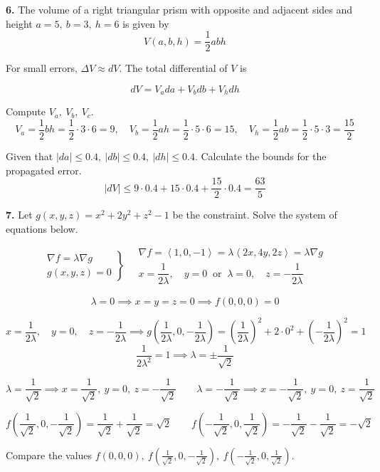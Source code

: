 \documentclass{article}
\begin{document}
\vspace{1em}

\textbf{6.} The volume of a right triangular prism with opposite and adjacent sides and height $a=5,\:b=3,\:h=6$ is given by
\[V(a,b,h)=\frac12 abh\]

For small errors, $\Delta V\approx dV$. The total differential of $V$ is

\[dV=V_ada+V_bdb+V_hdh\]

Compute $V_a,\: V_b,\: V_c$.
\[V_a=\frac12bh=\frac12\cdot3\cdot6=9,\quad V_b=\frac12ah=\frac12\cdot5\cdot6=15,\quad V_h=\frac12ab=\frac12\cdot5\cdot3=\frac{15}2\]

Given that $|da|\leq0.4,\:|db|\leq0.4,\:|dh|\leq0.4$. Calculate the bounds for the propagated error.
\[\left|dV\right|\leq9\cdot0.4+15\cdot0.4+\frac{15}2\cdot0.4=\boxed{\frac{63}5}\]

\vspace{1em}

\textbf{7.} Let $g(x,y,z)=x^2+2y^2+z^2-1$ be the constraint. Solve the system of equations below.

\[
\left.
\begin{array}{c}
\displaystyle\nabla f=\lambda\nabla g\\
\displaystyle g(x,y,z)=0
\end{array}
\right\}\quad
\begin{array}{l}
\nabla f=\left\langle1,0,-1\right\rangle=\lambda\left\langle2x,4y,2z\right\rangle=\lambda\nabla g\\[1em]x=\dfrac1{2\lambda},\quad y=0\:\text{ or }\:\lambda=0,\quad z=-\dfrac1{2\lambda}
\end{array}
\]

\[\lambda=0\implies x=y=z=0\implies f(0,0,0)=0\]

\[x=\frac1{2\lambda},\quad y=0,\quad z=-\frac1{2\lambda}\implies g\left(\frac1{2\lambda},0,-\frac1{2\lambda}\right)=\left(\frac1{2\lambda}\right)^2+2\cdot0^2+\left(-\frac1{2\lambda}\right)^2=1\]
\[\frac1{2\lambda^2}=1\implies\lambda=\pm\frac1{\sqrt2}\]

\[\lambda=\frac1{\sqrt2}\implies x=\frac1{\sqrt2},\: y=0,\: z=-\frac1{\sqrt2}\qquad\lambda=-\frac1{\sqrt2}\implies x=-\frac1{\sqrt2},\: y=0,\: z=\frac1{\sqrt2}\]

\[f\left(\frac1{\sqrt2},0,-\frac1{\sqrt2}\right)=\frac1{\sqrt2}+\frac1{\sqrt2}=\sqrt2\qquad f\left(-\frac1{\sqrt2},0,\frac1{\sqrt2}\right)=-\frac1{\sqrt2}-\frac1{\sqrt2}=-\sqrt2\]

Compare the values $\displaystyle f(0,0,0),\:f\left(\frac1{\sqrt2},0,-\frac1{\sqrt2}\right),\:f\left(-\frac1{\sqrt2},0,\frac1{\sqrt2}\right)$.
\end{document}
